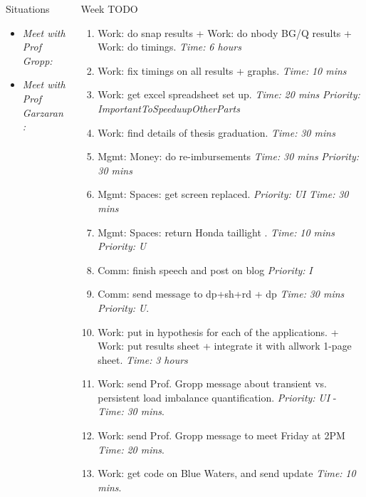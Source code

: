 \documentclass[serif, mathserif, final]{beamer}
\newcommand{\timeEst}[1]{\textit{Time:} \textit{#1}}
\newcommand{\priority}[1]{\textit{Priority:} \textit{#1}}
\begin{document}
\begin{frame}{}
\begin{columns}
\begin{column}{0.25\linewidth}
  \begin{block}{ Situations} 
    \begin{itemize} 
    \item \tiny \textit{Meet with Prof Gropp: }
    \item \tiny \textit{Meet with Prof Garzaran:}  
    \end{itemize}
  \end{block} 
\end{column} %
\begin{column}{0.50\linewidth}

\begin{block}{Week TODO} 
\begin{enumerate} 
\item \tiny Work: do snap results +  Work: do nbody BG/Q results + Work: do timings. \timeEst{6 hours}

\item \tiny Work: fix timings on all results + graphs. \timeEst{10 mins} 

\item \tiny Work: get excel spreadsheet set up. \timeEst{20 mins} \priority{ImportantToSpeeduupOtherParts}
\item \tiny Work: find details of thesis graduation. \timeEst{ 30 mins} 

\item \tiny Mgmt: Money: do re-imbursements \timeEst{30 mins} \priority{30 mins} 
\item \tiny Mgmt: Spaces: get screen replaced. \priority{UI} \timeEst{30 mins} 

\item \tiny Mgmt: Spaces: return Honda taillight . \timeEst{10 mins} \priority{U} 
\item \tiny Comm: finish speech and post on blog \priority{I}

\item \tiny Comm: send message to dp+sh+rd   + dp \timeEst{30 mins} \priority{U}. 


\item \tiny Work: put in hypothesis for each of the applications.  + Work: put results sheet  + integrate it with allwork 1-page sheet.  \timeEst{3 hours}
\item \tiny Work: send Prof. Gropp message about transient vs. persistent load imbalance quantification. \priority{UI} - \timeEst{30 mins}. 
\item \tiny Work: send Prof. Gropp message to meet Friday at 2PM \timeEst{20 mins}. 
\item \tiny Work: get code on Blue Waters, and send update \timeEst{10 mins}.  


\end{enumerate}
\end{block}
\end{column}
\end{columns}
\end{frame}
\end{document}
